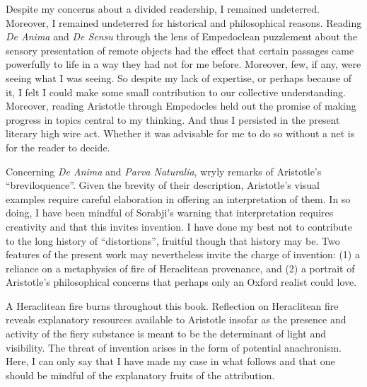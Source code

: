 Despite my concerns about a divided readership, I remained undeterred. Moreover, I remained undeterred for historical and philosophical reasons. Reading \emph{De Anima} and \emph{De Sensu} through the lens of Empedoclean puzzlement about the sensory presentation of remote objects had the effect that certain passages came powerfully to life in a way they had not for me before. Moreover, few, if any, were seeing what I was seeing. So despite my lack of expertise, or perhaps because of it, I felt I could make some small contribution to our collective understanding. Moreover, reading Aristotle through Empedocles held out the promise of making progress in topics central to my thinking. And thus I persisted in the present literary high wire act. Whether it was advisable for me to do so without a net is for the reader to decide.

Concerning \emph{De Anima} and \emph{Parva Naturalia}, \citet[vii]{Hammond:1902kx} wryly remarks of Aristotle's ``breviloquence''. Given the brevity of their description, Aristotle's visual examples require careful elaboration in offering an interpretation of them. In so doing, I have been mindful of Sorabji's \citeyearpar[225]{Sorabji:2003fk} warning that interpretation requires creativity and that this invites invention. I have done my best not to contribute to the long history of ``distortions'', fruitful though that history may be. Two features of the present work may nevertheless invite the charge of invention: (1) a reliance on a metaphysics of fire of Heraclitean provenance, and (2) a portrait of Aristotle's philosophical concerns that perhaps only an Oxford realist could love. 

A Heraclitean fire burns throughout this book. Reflection on Heraclitean fire reveals explanatory resources available to Aristotle insofar as the presence and activity of the fiery substance is meant to be the determinant of light and visibility. The threat of invention arises in the form of potential anachronism. Here, I can only say that I have made my case in what follows and that one should be mindful of the explanatory fruits of the attribution. 

